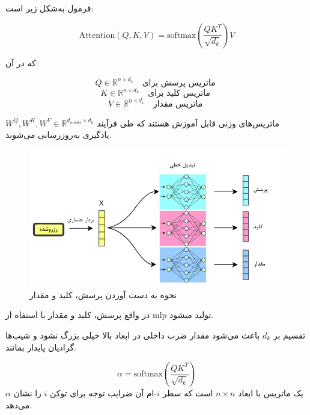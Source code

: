 فرمول به‌شکل زیر است:

\begin{equation}
	\text{Attention}(Q, K, V) = \text{softmax}\left( \frac{QK^T}{\sqrt{d_k}} \right) V
	\label{eq:attention}
\end{equation}

که در آن:

\[
Q \in \mathbb{R}^{n \times d_k} \quad \text{ماتریس پرسش برای }
\]
\[
K \in \mathbb{R}^{n \times d_k} \quad \text{ماتریس کلید برای }
\]
\[
V \in \mathbb{R}^{n \times d_v} \quad \text{ماتریس مقدار  }
\]



	 \( W^Q, W^K, W^V \in \mathbb{R}^{d_{model} \times d_k} \) ماتریس‌های وزنی قابل آموزش هستند که طی فرآیند یادگیری به‌روزرسانی می‌شوند.
	 
\begin{figure}[h]
	\centering
	\begin{minipage}[b]{0.7\textwidth}
		\centering
		\includegraphics[width=\textwidth]{transformer_images/persian images/persian_images/b19.png}
		\caption{نحوه به دست آوردن پرسش، کلید و مقدار}
		\label{fig:qkv}
	\end{minipage}
	\hfill
\end{figure}


در واقع پرسش، کلید و مقدار با استفاه از mlp  تولید میشود.



تقسیم بر \( d_k \) باعث می‌شود مقدار ضرب داخلی در ابعاد بالا خیلی بزرگ نشود و شیب‌ها گرادیان پایدار بمانند.

\begin{equation}
	\alpha = \text{softmax}\left( \frac{QK^T}{\sqrt{d_k}} \right)
	\label{eq:alpha}
\end{equation}
\(\alpha\) یک ماتریس با ابعاد \( n \times n \) است که سطر \( i \)-ام آن ضرایب توجه برای توکن \( i \) را نشان می‌دهد.

